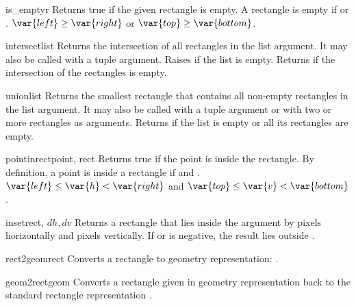 \begin{funcdesc}{is_empty}{r}
Returns true if the given rectangle is empty.
A rectangle
is empty if
\iftexi
 or .
\else
$\var{left} \geq \var{right}$ or $\var{top} \geq \var{bottom}$.
\fi
\end{funcdesc}

\begin{funcdesc}{intersect}{list}
Returns the intersection of all rectangles in the list argument.
It may also be called with a tuple argument.
Raises
if the list is empty.
Returns
if the intersection of the rectangles is empty.
\end{funcdesc}

\begin{funcdesc}{union}{list}
Returns the smallest rectangle that contains all non-empty rectangles in
the list argument.
It may also be called with a tuple argument or with two or more
rectangles as arguments.
Returns
if the list is empty or all its rectangles are empty.
\end{funcdesc}

\begin{funcdesc}{pointinrect}{point, rect}
Returns true if the point is inside the rectangle.
By definition, a point
is inside a rectangle
 if
\iftexi
 and
.
\else
$\var{left} \leq \var{h} < \var{right}$ and
$\var{top} \leq \var{v} < \var{bottom}$.
\fi
\end{funcdesc}

\begin{funcdesc}{inset}{rect, \(dh, dv\)}
Returns a rectangle that lies inside the
argument by
pixels horizontally
and
pixels
vertically.
If
or
is negative, the result lies outside
.
\end{funcdesc}

\begin{funcdesc}{rect2geom}{rect}
Converts a rectangle to geometry representation:
.
\end{funcdesc}

\begin{funcdesc}{geom2rect}{geom}
Converts a rectangle given in geometry representation back to the
standard rectangle representation
.
\end{funcdesc}
